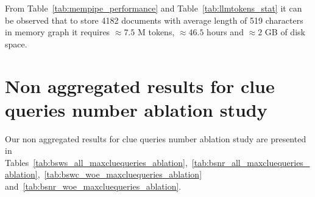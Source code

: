From Table~\ref{tab:mempipe_performance} and Table~\ref{tab:llmtokens_stat} it can be observed that to store 4182 documents with average length of 519 characters in memory graph it requires $\approx 7.5 $ M tokens, $\approx 46.5$ hours and $\approx 2$ GB of disk space.




\section{Non aggregated results for clue queries number ablation study}
\label{app:nonaggr_clueq}
Our non aggregated results for clue queries number ablation study are presented in Tables~\ref{tab:bsws_all_maxcluequeries_ablation},~\ref{tab:bsnr_all_maxcluequeries_ablation},~\ref{tab:bswc_woe_maxcluequeries_ablation} and~\ref{tab:bsnr_woe_maxcluequeries_ablation}.


